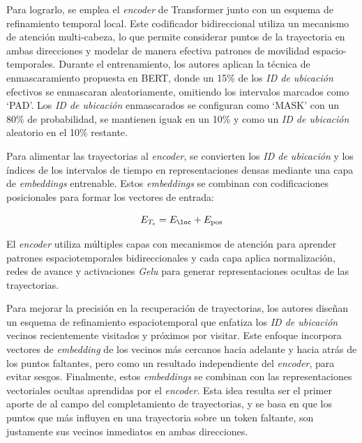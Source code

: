 Para lograrlo, se emplea el \textit{encoder} de Transformer junto con un esquema de refinamiento temporal local. Este codificador bidireccional utiliza un mecanismo de atención multi-cabeza, lo que permite considerar puntos de la trayectoria en ambas direcciones y modelar de manera efectiva patrones de movilidad espacio-temporales. Durante el entrenamiento, los autores aplican la técnica de enmascaramiento propuesta en BERT, donde un 15\% de los \textit{ID de ubicación} efectivos se enmascaran aleatoriamente, omitiendo los intervalos marcados como ‘PAD’. Los \textit{ID de ubicación} enmascarados se configuran como ‘MASK’ con un 80\% de probabilidad, se mantienen iguak en un 10\% y como un \textit{ID de ubicación} aleatorio en el 10\% restante.

Para alimentar las trayectorias al \textit{encoder}, se convierten los \textit{ID de ubicación} y los índices de los intervalos de tiempo en representaciones densas mediante una capa de \textit{embeddings} entrenable. Estos \textit{embeddings} se combinan con codificaciones posicionales para formar los vectores de entrada:

\begin{equation}
E_{T_\epsilon} = E_{\loc} + E_{\text{pos}}
\end{equation}

El \textit{encoder} utiliza múltiples capas con mecanismos de atención para aprender patrones espaciotemporales bidireccionales y cada capa aplica normalización, redes de avance y activaciones \textit{Gelu} para generar representaciones ocultas de las trayectorias.

Para mejorar la precisión en la recuperación de trayectorias, los autores diseñan un esquema de refinamiento espaciotemporal que enfatiza los \textit{ID de ubicación} vecinos recientemente visitados y próximos por visitar. Este enfoque incorpora vectores de \textit{embedding} de los vecinos más cercanos hacia adelante y hacia atrás de los puntos faltantes, pero como un resultado independiente del \textit{encoder}, para evitar sesgos. Finalmente, estos \textit{embeddings} se combinan con las representaciones vectoriales ocultas aprendidas por el \textit{encoder}. Esta idea resulta ser el primer aporte de \cite{si2023trajbert} al campo del completamiento de trayectorias, y se basa en que los puntos que más influyen en una trayectoria sobre un token faltante, son justamente sus vecinos inmediatos en ambas direcciones.


